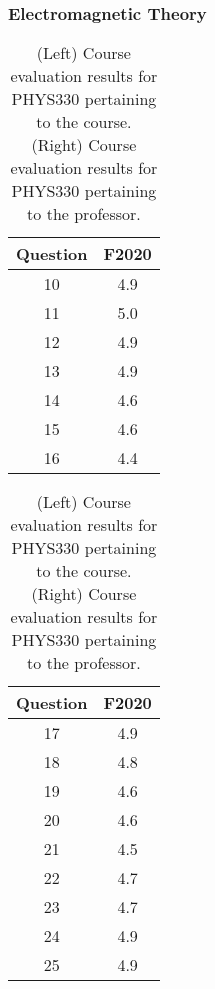 \documentclass[../../main.tex]{subfiles}
\begin{document}
\subsubsection{Electromagnetic Theory}

\begin{table}
\footnotesize
\centering
\begin{tabular}{| c | c |}
\hline
\hline
Question & F2020 \\ \hline
10 & 4.9 \\ \hline
11 & 5.0 \\ \hline
12 & 4.9 \\ \hline
13 & 4.9 \\ \hline
14 & 4.6 \\ \hline
15 & 4.6 \\ \hline
16 & 4.4 \\ \hline
\hline
\end{tabular}
\begin{tabular}{| c | c |}
\hline
\hline
Question & F2020 \\ \hline
17 & 4.9 \\ \hline
18 & 4.8 \\ \hline
19 & 4.6 \\ \hline
20 & 4.6 \\ \hline
21 & 4.5 \\ \hline
22 & 4.7 \\ \hline
23 & 4.7 \\ \hline
24 & 4.9 \\ \hline
25 & 4.9 \\ \hline
\hline
\end{tabular}
\caption{\label{tab:eval_330} (Left) Course evaluation results for PHYS330 pertaining to the course.  (Right) Course evaluation results for PHYS330 pertaining to the professor.}
\end{table}
\end{document}
